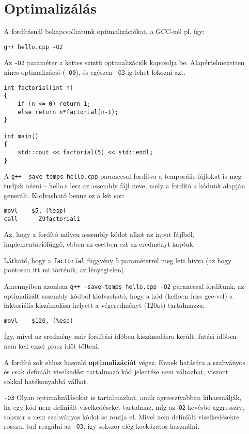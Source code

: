 \documentclass[a4paper,11.5pt]{article}
\begin{document}
	\section{Optimalizálás}
	A fordításnál bekapcsolhatunk optimalizációkat, a GCC-nél pl. így:
	
	{\centering \texttt{g++ hello.cpp -O2} \par}
	
	Az \texttt{-O2} paraméter a kettes szintű optimalizációk kapcsolja be. Alapértelmezetten nincs optimalizáció (\texttt{-O0}), és egészen \texttt{-O3}-ig lehet fokozni azt.
	\bigskip
	
	\begin{lstlisting}
int factorial(int n)
{
	if (n <= 0) return 1;
	else return n*factorial(n-1);
}

int main()
{
	std::cout << factorial(5) << std::endl;
}
	\end{lstlisting}
	
	A \texttt{g++ -save-temps hello.cpp} paranccsal fordítva a temporális fájlokat is meg tudjuk nézni -- hello.s lesz az assembly fájl neve, mely a fordító a kódunk alapján generált. Kiolvasható benne ez a két sor:
	\begin{lstlisting}
movl 	$5, (%esp)
call	__Z9factoriali
	\end{lstlisting}
	\begin{note}
		Az, hogy a fordító milyen assembly kódot alkot az input fájlból, implementációfüggő, ebben az esetben ezt az eredményt kaptuk.
	\end{note}
	Látható, hogy a \texttt{factorial} függvény 5 paraméterrel meg lett hívva (az hogy pontosan itt mi történik, az lényegtelen).
	
	\medskip
	Amennyiben azonban \texttt{g++ -save-temps hello.cpp -O2} paranccsal fordítunk, az optimalizált assembly kódból kiolvasható, hogy a kód (kellően friss gcc-vel) a faktoriális kiszámolása helyett a végeredményt (120at) tartalmazza. 
	\begin{lstlisting}
movl	$120, (%esp)
	\end{lstlisting}
	Így, mivel az eredmény már fordítási időben kiszámolásra került, futási időben nem kell ezzel plusz időt tölteni.
	
	A fordító sok ehhez hasonló \textbf{optimalizációt} végez. Ennek hatására a szabványos és csak definiált viselkedést tartalmazó kód jelentése nem változhat, viszont sokkal hatékonyabbá válhat.
	\begin{note}
		\texttt{-O3} Olyan optimalizálásokat is tartalmazhat, amik agresszívabban kihasználják, ha egy kód nem definiált viselkedéseket tartalmaz, míg az\texttt{-O2} kevésbé aggresszív, sokszor a nem szabványos kódot se rontja el. Mivel nem definiált viselkedésekre rosszul tud reagálni az \texttt{-O3}, így sokszor elég kockázatos használni.
	\end{note}
\end{document}
